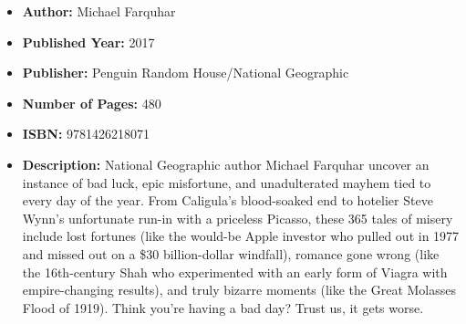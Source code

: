 \documentclass{tufte-handout}
\begin{document}
\begin{itemize}
    \item[] \textbf{Author:} Michael Farquhar
    \item[] \textbf{Published Year:} 2017
    \item[] \textbf{Publisher:} Penguin Random House/National Geographic
    \item[] \textbf{Number of Pages:} 480      
    \item[] \textbf{ISBN:} 9781426218071
    \item[] \textbf{Description:} National Geographic author Michael Farquhar uncover an instance of bad luck, epic misfortune, and unadulterated mayhem tied to every day of the year. From Caligula’s blood-soaked end to hotelier Steve Wynn’s unfortunate run-in with a priceless Picasso, these 365 tales of misery include lost fortunes (like the would-be Apple investor who pulled out in 1977 and missed out on a \$30 billion-dollar windfall), romance gone wrong (like the 16th-century Shah who experimented with an early form of Viagra with empire-changing results), and truly bizarre moments (like the Great Molasses Flood of 1919). Think you’re having a bad day? Trust us, it gets worse.
\end{itemize}
\end{document}
